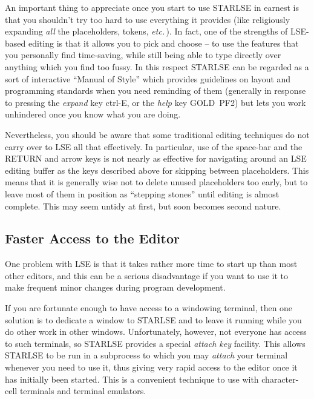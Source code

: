 An important thing to appreciate once you start to use \mbox{STARLSE} in
earnest is that you shouldn't try too hard to use everything it provides
(like religiously expanding {\em all} the placeholders, tokens, {\em
etc.}\,). 
In fact, one of the strengths of \mbox{LSE}-based editing is that it allows
you to pick and choose -- to use the features that you personally find
time-saving, while still being able to type directly over anything which you
find too fussy. 
In this respect \mbox{STARLSE} can be regarded as a sort of interactive
``Manual of Style'' which provides guidelines on layout and programming
standards when you need reminding of them (generally in response to pressing
the {\em expand} key \mbox{ctrl-E}, or the {\em help} key
\mbox{GOLD}~\mbox{PF2}) but lets you work unhindered once you know what you
are doing. 

Nevertheless, you should be aware that some traditional editing techniques
do not carry over to LSE all that effectively. 
In particular, use of the space-bar and the RETURN and arrow keys is not 
nearly as effective for navigating around an LSE editing buffer as the keys 
described above for skipping between placeholders.
This means that it is generally wise not to delete unused placeholders too
early, but to leave most of them in position as ``stepping stones'' until
editing is almost complete. 
This may seem untidy at first, but soon becomes second nature.


\subsection{Faster Access to the Editor}
\label{sect:attaching}
One problem with LSE is that it takes rather more time to start up than most
other editors, and this can be a serious disadvantage if you want to use it to
make frequent minor changes during program development.

If you are fortunate enough to have access to a windowing terminal, then one
solution is to dedicate a window to STARLSE and to leave it running while you do
other work in other windows. Unfortunately, however, not everyone has access to
such terminals, so STARLSE provides a special {\em attach key} facility. This
allows STARLSE to be run in a subprocess to which you may {\em attach} your
terminal whenever you need to use it, thus giving very rapid access to the
editor once it has initially been started. This is a convenient technique to use
with character-cell terminals and terminal emulators.

